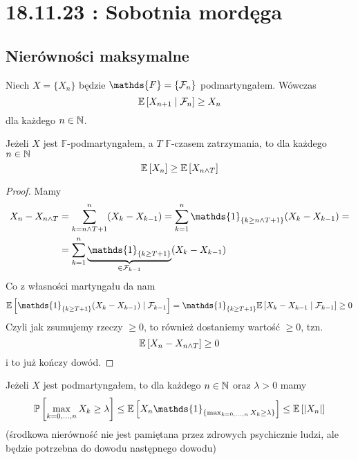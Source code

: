\section{18.11.23 : Sobotnia mordęga}

\subsection{Nierówności maksymalne}

Niech $X=\{X_n\}$ będzie $\mathds{F}=\{\set{F}_n\}$ podmartyngałem. Wówczas 
$$\expected{X_{n+1}}{\set{F}_n}\geq X_n$$
dla każdego $n\in\operatorname{\mathbb{N}}$.

\begin{theorem}\label{zatrzymanie podmartyngałów}
  Jeżeli $X$ jest $\mathds{F}$-podmartyngałem, a $T$ $\mathds{F}$-czasem zatrzymania, to dla każdego $n\in\operatorname{\mathbb{N}}$ 
  $$\expected{X_n}\geq\expected{X_{n\land T}}$$
\end{theorem}

\begin{proof}
  Mamy 
  \begin{align*}
    X_n-X_{n\land T}&=\sum_{k=n\land T+1}^n(X_k-X_{k-1})=\sum_{k=1}^n\mathds{1}_{\{k\geq n\land T+1\}}(X_k-X_{k-1})=\\ 
                    &=\sum_{k=1}^n\underbrace{\mathds{1}_{\{k\geq T+1\}}}_{\in\set{F}_{k-1}}(X_k-X_{k-1})
  \end{align*}
  Co z własności martyngału da nam
  \begin{align*}
    \expected{\mathds{1}_{\{k\geq T+1\}}(X_k-X_{k-1})}{\set{F}_{k-1}}=\mathds{1}_{\{k\geq T+1\}}\expected{X_k-X_{k-1}}{\set{F}_{k-1}}\geq 0
  \end{align*}
  Czyli jak zsumujemy rzeczy $\geq0$, to również dostaniemy wartość $\geq0$, tzn.
  $$\expected{X_n-X_{n\land T}}\geq0$$
  i to już kończy dowód.
\end{proof}

\begin{theorem}\label{max slabego}
  Jeżeli $X$ jest podmartyngałem, to dla każdego $n\in\operatorname{\mathbb{N}}$ oraz $\lambda>0$ mamy
  $$\prob{\max_{k=0,...,n}X_k\geq\lambda}\leq \expected{X_n\mathds{1}_{\{\max_{k=0,...,n}X_k\geq \lambda\}}}\leq \expected{|X_n|}$$
  (środkowa nierówność nie jest pamiętana przez zdrowych psychicznie ludzi, ale będzie potrzebna do dowodu następnego dowodu)
\end{theorem}

